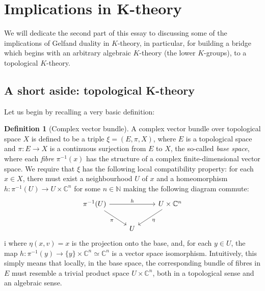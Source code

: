 \documentclass[aps,pra,showpacs,notitlepage,onecolumn,superscriptaddress,nofootinbib]{revtex4-1}
\theoremstyle{definition}
\newtheorem{definition}{Definition}[section]
\begin{document}
\section{Implications in K-theory}

\noindent We will dedicate the second part of this essay to discussing some of the implications of Gelfand duality in $K$-theory, in particular, for building a bridge which begins with
an arbitrary algebraic $K$-theory (the lower $K$-groups), to a topological $K$-theory.

\subsection{A short aside: topological K-theory}

\noindent Let us begin by recalling a very basic definition:

\begin{definition}[Complex vector bundle]
  A complex vector bundle over topological space $X$ is defined to be a triple $\xi = (E, \pi, X)$, where $E$ is a topological space and $\pi : E \rightarrow X$ is a continuous surjection
  from $E$ to $X$, the so-called \emph{base space}, where each \emph{fibre} $\pi^{-1}(x)$ has the structure of a complex finite-dimensional vector space. We require that $\xi$ has the following
  local compatibility property: for each $x \in X$, there must exist a neighbourhood $U$ of $x$ and a homeomorphism $h : \pi^{-1}(U) \rightarrow U \times \mathbb{C}^n$ for some $n \in \mathbb{N}$
  making the following diagram commute:
  \[\begin{tikzcd}
	          {\pi^{-1}(U)} && {U \times \mathbb{C}^{n}} \\
	          & U
	          \arrow["h", from=1-1, to=1-3]
	          \arrow["\pi"', from=1-1, to=2-2]
	          \arrow["\eta", from=1-3, to=2-2]
  \end{tikzcd}\]i
  where $\eta(x, v) = x$ is the projection onto the base, and, for each $y \in U$, the map $h : \pi^{-1}(y) \rightarrow \{y\} \times \mathbb{C}^n \simeq \mathbb{C}^n$ is a vector
  space isomorphism. Intuitively, this simply means that locally, in the base space, the corresponding bundle of fibres in $E$ must resemble a trivial product space $U \times \mathbb{C}^n$,
  both in a topological sense and an algebraic sense.
\end{definition}
\end{document}
